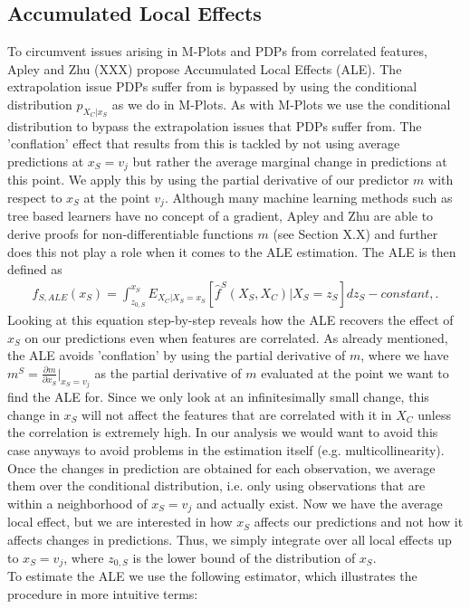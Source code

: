 \subsection{Accumulated Local Effects}
To circumvent issues arising in M-Plots and PDPs from correlated features, Apley and Zhu (XXX) propose Accumulated Local Effects (ALE). The extrapolation issue PDPs suffer from is bypassed by using the conditional distribution $p_{X_C|x_S}$ as we do in M-Plots. As with M-Plots we use the conditional distribution to bypass the extrapolation issues that PDPs suffer from. The 'conflation' effect that results from this is tackled by not using average predictions at $x_S=v_j$ but rather the average marginal change in predictions at this point. We apply this by using the partial derivative of our predictor $m$ with respect to $x_S$ at the point $v_j$. Although many machine learning methods such as tree based learners have no concept of a gradient, Apley and Zhu are able to derive proofs for non-differentiable functions $m$ (see Section X.X) and further does this not play a role when it comes to the ALE estimation. The ALE is then defined as
\begin{align}
\hat{f}_{S, ALE} (x_S)=\int_{z_{0, S}}^{x_S} E_{X_C|X_S=x_S}[\hat{f}^S(X_S, X_C)|X_S=z_S]dz_S - constant, \label{eq:ale}.
\end{align}
Looking at this equation step-by-step reveals how the ALE recovers the effect of $x_S$ on our predictions even when features are correlated. As already mentioned, the ALE avoids 'conflation' by using the partial derivative of $m$, where we have $m^S=\frac{\partial m}{\partial x_S}\rvert_{x_S=v_j}$ as the partial derivative of $m$ evaluated at the point we want to find the ALE for. Since we only look at an infinitesimally small change, this change in $x_S$ will not affect the features that are correlated with it in $X_C$ unless the correlation is extremely high. In our analysis we would want to avoid this case anyways to avoid problems in the estimation itself (e.g. multicollinearity). Once the changes in prediction are obtained for each observation, we average them over the conditional distribution, i.e. only using observations that are within a neighborhood of $x_S=v_j$ and actually exist. Now we have the average local effect, but we are interested in how $x_S$ affects our predictions and not how it affects changes in predictions. Thus, we simply integrate over all local effects up to $x_S=v_j$, where $z_{0, S}$ is the lower bound of the distribution of $x_S$. \\
To estimate the ALE we use the following estimator, which illustrates the procedure in more intuitive terms: 
